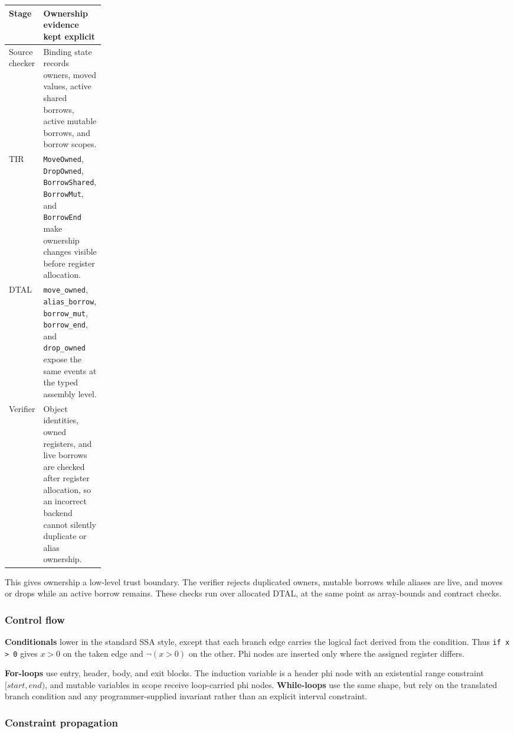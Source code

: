 \begin{center}
\small
\begin{tabularx}{\linewidth}{@{}p{0.19\linewidth}X@{}}
\toprule
\textbf{Stage} & \textbf{Ownership evidence kept explicit} \\
\midrule
Source checker & Binding state records owners, moved values, active shared borrows, active mutable borrows, and borrow scopes. \\
TIR & \texttt{MoveOwned}, \texttt{DropOwned}, \texttt{BorrowShared}, \texttt{BorrowMut}, and \texttt{BorrowEnd} make ownership changes visible before register allocation. \\
DTAL & \texttt{move\_owned}, \texttt{alias\_borrow}, \texttt{borrow\_mut}, \texttt{borrow\_end}, and \texttt{drop\_owned} expose the same events at the typed assembly level. \\
Verifier & Object identities, owned registers, and live borrows are checked after register allocation, so an incorrect backend cannot silently duplicate or alias ownership. \\
\bottomrule
\end{tabularx}
\end{center}

This gives ownership a low-level trust boundary. The verifier rejects duplicated owners, mutable borrows while aliases are live, and moves or drops while an active borrow remains. These checks run over allocated DTAL, at the same point as array-bounds and contract checks.

\subsubsection{Control flow}

\textbf{Conditionals} lower in the standard SSA style, except that each branch edge carries the logical fact derived from the condition. Thus \texttt{if x > 0} gives $x > 0$ on the taken edge and $\neg(x > 0)$ on the other. Phi nodes are inserted only where the assigned register differs.

\textbf{For-loops} use entry, header, body, and exit blocks. The induction variable is a header phi node with an existential range constraint $[\mathit{start}, \mathit{end})$, and mutable variables in scope receive loop-carried phi nodes. \textbf{While-loops} use the same shape, but rely on the translated branch condition and any programmer-supplied invariant rather than an explicit interval constraint.

\subsubsection{Constraint propagation}

